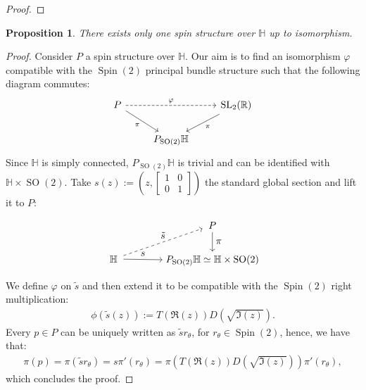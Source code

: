 \documentclass[12pt]{amsart}
\newtheorem{proposition}{Proposition}%
\theoremstyle{definition}
\def\RR{{\mathbb R}}
\def\HH{{\mathbb{H}}}
\newcommand{\slinear}{\operatorname{SL}}
\newcommand{\so}{\operatorname{SO}}
\newcommand{\spin}{\operatorname{Spin}}
\begin{document}
\begin{proof}
\end{proof}

\begin{proposition}\label{oneSpinStructure}
There exists only one spin structure over $\HH$ up to isomorphism.
\end{proposition}
\begin{proof}
Consider $P$ a spin structure over $\HH$. Our aim is to find an isomorphism $\varphi$ compatible with the $\spin(2)$ principal bundle structure such that the following diagram commutes:
\begin{equation}\label{diagramPiPhi}
\begin{tikzcd}
P \arrow{dr}[swap]{\pi} \arrow[dashed]{rr}{\varphi} && \slinear_2(\RR) \arrow{dl}{\pi} \\
& P_{\so(2)}\HH
\end{tikzcd}
\end{equation}
Since $\HH$ is simply connected, $P_{\so(2)}\HH$ is trivial and can be identified with $\HH\times \so(2)$. Take $s(z):=\left( z,\begin{bmatrix}
1 & 0 \\
0 & 1
\end{bmatrix} \right)$ the standard global section and lift it to $P$:
\begin{equation*}
\begin{tikzpicture}[baseline=(current  bounding  box.center)]
  \matrix (m) [matrix of math nodes,row sep=2em,column sep=4em,minimum width=2em]
  {
      {} & P \\
      \HH & P_{\so(2)}\HH \simeq \HH\times \so(2) \\
  };
  \path[->]
    (m-2-1) edge node [ above] {$s$} (m-2-2)
    (m-1-2) edge node [right] {$\pi$} (m-2-2)
    (m-2-1)	edge [dashed] node [above] {$\tilde{s}$} (m-1-2);
\end{tikzpicture}
\end{equation*}
We define $\varphi$ on $\tilde{s}$ and then extend it to be compatible with the $\spin(2)$ right multiplication:
\begin{align*}
\phi(\tilde{s}(z)) := T(\Re(z))D(\sqrt{\Im(z)}).
\end{align*}
Every $p\in P$ can be uniquely written as $\tilde{s} r_{\theta}$, for $r_{\theta}\in \spin(2)$, hence, we have that:
\begin{align*}
\pi(p) = \pi(\tilde{s}r_{\theta}) = s\pi'(r_{\theta}) = \pi\left( T(\Re(z))D(\sqrt{\Im(z)})\right) \pi'(r_{\theta}),
\end{align*}
which concludes the proof.
\end{proof}
\end{document}
